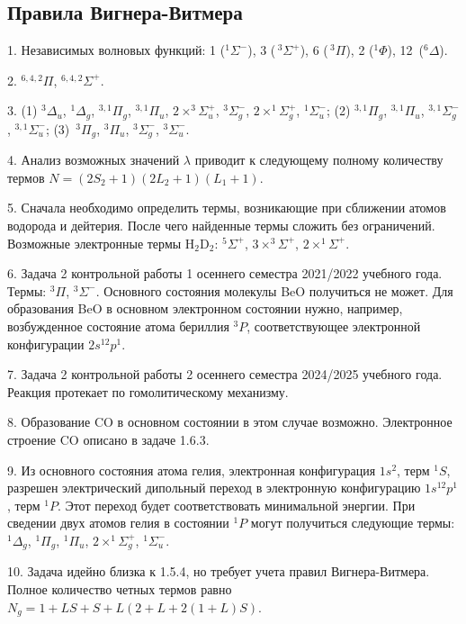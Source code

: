 \subsection{Правила Вигнера-Витмера}
1. Независимых волновых функций: 1 ($^1\Sigma^-$), 3 ($\,^3\Sigma^+$), 6 ($\,^3\Pi$), 2 ($^1\Phi$), 12~($^6\Delta$). \par
2.  $^{6,4,2}\Pi$,  $^{6,4,2}\Sigma^+$.\par
3. (1) $^3\Delta_u$, $^1\Delta_g$, $^{3,1}\Pi_g$, $^{3,1}\Pi_u$, $2 \times ^{3}\Sigma_u^+$, $^3\Sigma^-_g$, $2 \times ^{1}\Sigma_g^+$, $^{1}\Sigma_u^-$; (2) $^{3,1}\Pi_g$, $^{3,1}\Pi_u$, $^{3,1}\Sigma^-_g$, $^{3,1}\Sigma^-_u$; (3)~$^3\Pi_g$, $^3\Pi_u$, $^3\Sigma^-_g$, $^3\Sigma^-_u$.\par
4. Анализ возможных значений $\lambda$ приводит к следующему полному количеству термов $ N = (2S_2+1)(2L_2+1)(L_1+1).$\par
5. Сначала необходимо определить термы, возникающие при сближении атомов водорода и дейтерия. После чего найденные термы сложить без ограничений. Возможные электронные термы H$_2$D$_2$: $^{5}\Sigma^+$, $3 \times ^{3}\Sigma^+$, $2 \times ^{1}\Sigma^+$.\par
6. Задача 2 контрольной работы 1 осеннего семестра 2021/2022 учебного года. Термы: $^3\Pi$, $^3\Sigma^-$. Основного состояния молекулы BeO получиться не может. Для образования BeO в основном электронном состоянии нужно, например, возбужденное состояние атома бериллия $^3P$, соответствующее электронной конфигурации $2s^12p^1$.\par
7. Задача 2 контрольной работы 2 осеннего семестра 2024/2025 учебного года. Реакция протекает по гомолитическому механизму.\par
8. Образование CO в основном состоянии в этом случае возможно. Электронное строение CO описано в задаче 1.6.3.\par
9. Из основного состояния атома гелия, электронная конфигурация $1s^2$, терм $^1S$, разрешен электрический дипольный переход в электронную конфигурацию $1s^12p^1$, терм $^1P$. Этот переход будет соответствовать минимальной энергии. При сведении двух атомов гелия в состоянии $^1P$ могут получиться следующие термы: $^1\Delta_g$, $^1\Pi_g$, $^1\Pi_u$, $2 \times ^1\Sigma^+_g$, $^1\Sigma^-_u$.\par
10. Задача идейно близка к 1.5.4, но требует учета правил Вигнера-Витмера. Полное количество четных термов равно $N_g = 1 + LS + S + L(2 + L + 2(1 + L)S)$.\par
\newpage

